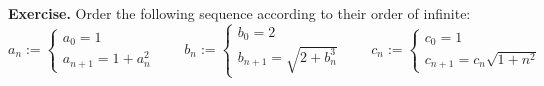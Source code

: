 \documentclass[a4paper,10 pt]{report}
\theoremstyle{definition}
\begin{document}
\begin{exerciseBox} \textbf{Exercise.} Order the following sequence according to their order of infinite:
\begin{equation*}a_n := \begin{cases} a_0 = 1 \\[0.7em] a_{n + 1} = 1 + a_n^2 \end{cases} \qquad b_n := \begin{cases} b_0 = 2 \\[0.7em] b_{n + 1} = \sqrt{2 + b_n^3} \end{cases} \qquad c_n := \begin{cases} c_0 = 1 \\[0.7em] c_{n + 1} = c_n \sqrt{1 + n^2} \end{cases}\end{equation*}
\end{exerciseBox}
\end{document}
